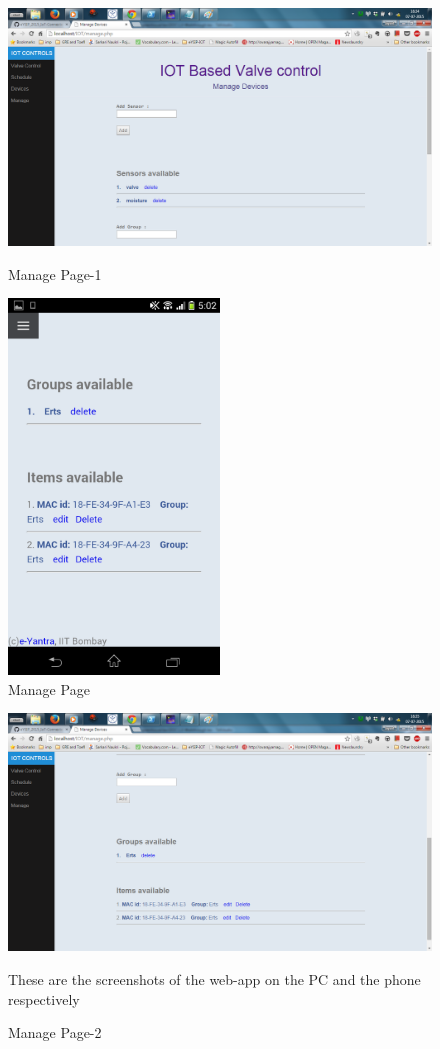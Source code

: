 \documentclass[16pt]{article}
\begin{document}
	\begin{figure}
		\includegraphics[width=1\textwidth]{images/manage1.png}
		\caption{Manage Page-1}
		\includegraphics[width=0.5\textwidth]{images/manage_page.png}
		\caption{Manage Page}
		
	\end{figure}
	\begin{figure}
		\includegraphics[width=1\textwidth]{images/manage2.png}
		\caption{Manage Page-2}
		\vspace{1cm}
		These are the  screenshots of the web-app on the PC and the phone respectively
		\vspace{10cm}
	\end{figure}
\end{document}
